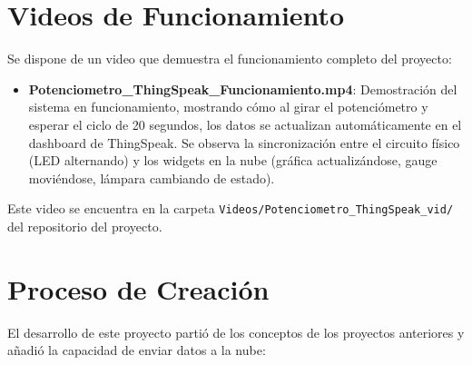 \documentclass[12pt,a4paper]{article}
\begin{document}
\section{Videos de Funcionamiento}

Se dispone de un video que demuestra el funcionamiento completo del proyecto:

\begin{itemize}
    \item \textbf{Potenciometro\_ThingSpeak\_Funcionamiento.mp4}: Demostración del sistema en funcionamiento, mostrando cómo al girar el potenciómetro y esperar el ciclo de 20 segundos, los datos se actualizan automáticamente en el dashboard de ThingSpeak. Se observa la sincronización entre el circuito físico (LED alternando) y los widgets en la nube (gráfica actualizándose, gauge moviéndose, lámpara cambiando de estado).
\end{itemize}

Este video se encuentra en la carpeta \texttt{Videos/Potenciometro\_ThingSpeak\_vid/} del repositorio del proyecto.

\section{Proceso de Creación}

El desarrollo de este proyecto partió de los conceptos de los proyectos anteriores y añadió la capacidad de enviar datos a la nube:
\end{document}
